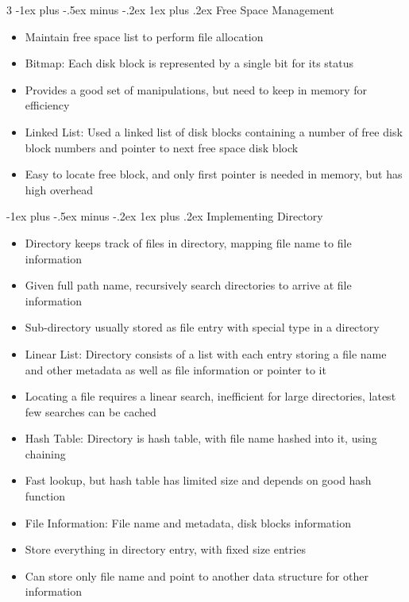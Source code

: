 \documentclass[10pt, landscape]{article}
\makeatletter
\renewcommand{\subsection}{\@startsection{subsection}{3}{0mm}%
                                {-1ex plus -.5ex minus -.2ex}%
                                {1ex plus .2ex}%
                                {\normalfont\small\bfseries}}%
\makeatother
\begin{document}
\begin{multicols*}{3}
\subsection{Free Space Management}
\begin{itemize}
    \item Maintain free space list to perform file allocation
    \item Bitmap: Each disk block is represented by a single bit for its status
    \item Provides a good set of manipulations, but need to keep in memory for efficiency
    \item Linked List: Used a linked list of disk blocks containing a number of free disk block numbers and pointer to next free space disk block
    \item Easy to locate free block, and only first pointer is needed in memory, but has high overhead
\end{itemize}

\subsection{Implementing Directory}
\begin{itemize}
    \item Directory keeps track of files in directory, mapping file name to file information
    \item Given full path name, recursively search directories to arrive at file information
    \item Sub-directory usually stored as file entry with special type in a directory
    \item Linear List: Directory consists of a list with each entry storing a file name and other metadata as well as file information or pointer to it
    \item Locating a file requires a linear search, inefficient for large directories, latest few searches can be cached
    \item Hash Table: Directory is hash table, with file name hashed into it, using chaining
    \item Fast lookup, but hash table has limited size and depends on good hash function
    \item File Information: File name and metadata, disk blocks information
    \item Store everything in directory entry, with fixed size entries
    \item Can store only file name and point to another data structure for other information
\end{itemize}


\end{multicols*}
\end{document}
